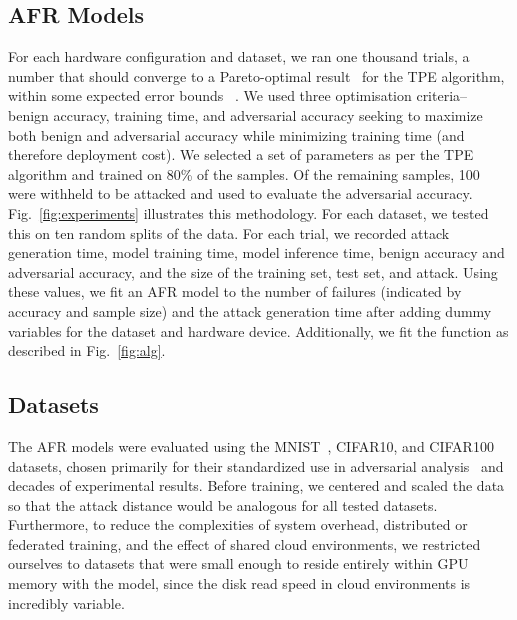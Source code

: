 \documentclass[journal]{IEEEtran}
\begin{document}
\subsection{AFR Models}

For each hardware configuration and dataset, we ran one thousand trials, a number that should converge to a Pareto-optimal result~\cite{ozaki2020multiobjective,zitzler2008quality} for the TPE algorithm, within some expected error bounds ~\cite{legriel2010approximating}. We used three optimisation criteria-- benign accuracy, training time, and adversarial accuracy seeking to maximize both benign and adversarial accuracy while minimizing training time (and therefore deployment cost). We selected a set of parameters as per the TPE algorithm and trained on 80\% of the samples. Of the remaining samples, 100 were withheld to be attacked and used to evaluate the adversarial accuracy. Fig.~\ref{fig:experiments} illustrates this methodology. For each dataset, we tested this on ten random splits of the data. For each trial, we recorded attack generation time, model training time, model inference time, benign accuracy and adversarial accuracy, and the size of the training set, test set, and attack. Using these values, we fit an AFR model to the number of failures (indicated by accuracy and sample size) and the attack generation time after adding dummy variables for the dataset and hardware device. Additionally, we fit the function as described in Fig.~\ref{fig:alg}.

\subsection{Datasets}
The AFR models were evaluated using the MNIST~\cite{mnist}, CIFAR10\cite{cifar}, and CIFAR100\cite{cifar} datasets, chosen primarily for their standardized use in adversarial analysis~\cite{madry2017towards,croce_reliable_2020,carlini_towards_2017,deepfool} and decades of experimental results.
Before training, we centered and scaled the data so that the attack distance would be analogous for all tested datasets. Furthermore, to reduce the complexities of system overhead, distributed or federated training, and the effect of shared cloud environments, we restricted ourselves to datasets that were small enough to reside entirely within GPU memory with the model, since the disk read speed in cloud environments is incredibly variable.
\end{document}

